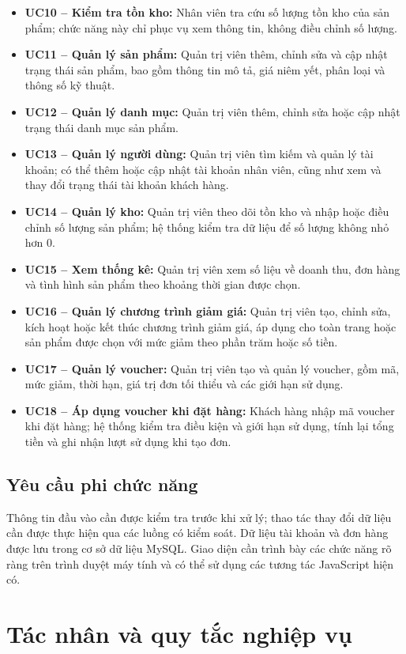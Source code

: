 \begin{itemize}
    \item \textbf{UC10 -- Kiểm tra tồn kho:} Nhân viên tra cứu số lượng tồn kho của sản phẩm; chức năng này chỉ phục vụ xem thông tin, không điều chỉnh số lượng.
    \item \textbf{UC11 -- Quản lý sản phẩm:} Quản trị viên thêm, chỉnh sửa và cập nhật trạng thái sản phẩm, bao gồm thông tin mô tả, giá niêm yết, phân loại và thông số kỹ thuật.
    \item \textbf{UC12 -- Quản lý danh mục:} Quản trị viên thêm, chỉnh sửa hoặc cập nhật trạng thái danh mục sản phẩm.
    \item \textbf{UC13 -- Quản lý người dùng:} Quản trị viên tìm kiếm và quản lý tài khoản; có thể thêm hoặc cập nhật tài khoản nhân viên, cũng như xem và thay đổi trạng thái tài khoản khách hàng.
    \item \textbf{UC14 -- Quản lý kho:} Quản trị viên theo dõi tồn kho và nhập hoặc điều chỉnh số lượng sản phẩm; hệ thống kiểm tra dữ liệu để số lượng không nhỏ hơn 0.
    \item \textbf{UC15 -- Xem thống kê:} Quản trị viên xem số liệu về doanh thu, đơn hàng và tình hình sản phẩm theo khoảng thời gian được chọn.
    \item \textbf{UC16 -- Quản lý chương trình giảm giá:} Quản trị viên tạo, chỉnh sửa, kích hoạt hoặc kết thúc chương trình giảm giá, áp dụng cho toàn trang hoặc sản phẩm được chọn với mức giảm theo phần trăm hoặc số tiền.
    \item \textbf{UC17 -- Quản lý voucher:} Quản trị viên tạo và quản lý voucher, gồm mã, mức giảm, thời hạn, giá trị đơn tối thiểu và các giới hạn sử dụng.
    \item \textbf{UC18 -- Áp dụng voucher khi đặt hàng:} Khách hàng nhập mã voucher khi đặt hàng; hệ thống kiểm tra điều kiện và giới hạn sử dụng, tính lại tổng tiền và ghi nhận lượt sử dụng khi tạo đơn.
\end{itemize}

\subsection{Yêu cầu phi chức năng}
Thông tin đầu vào cần được kiểm tra trước khi xử lý; thao tác thay đổi dữ liệu cần được thực hiện qua các luồng có kiểm soát. Dữ liệu tài khoản và đơn hàng được lưu trong cơ sở dữ liệu MySQL. Giao diện cần trình bày các chức năng rõ ràng trên trình duyệt máy tính và có thể sử dụng các tương tác JavaScript hiện có.

\section{Tác nhân và quy tắc nghiệp vụ}
